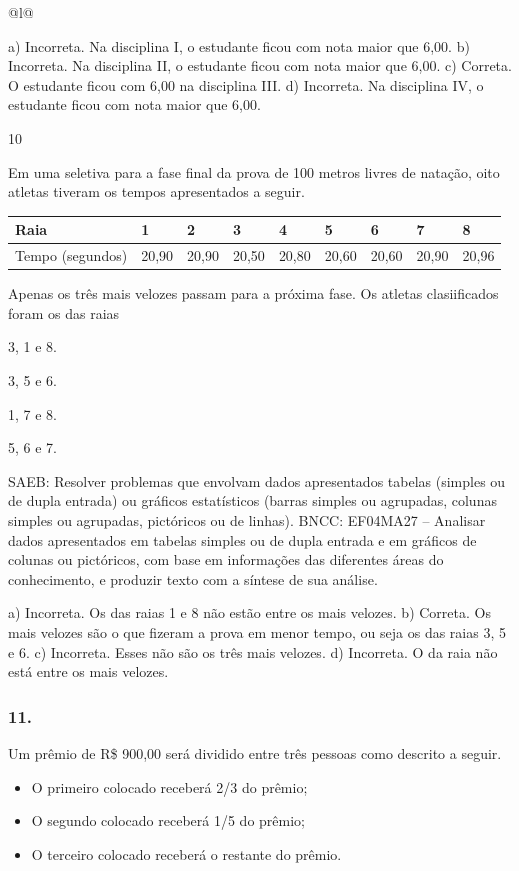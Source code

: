 \begin{mdframed}[linewidth=2pt,linecolor=salmao,roundcorner=2pt]
\begin{escolha}
{{{\begin{longtable}[]{@{}l@{}}
\begin{itemize}
{a) Incorreta. Na disciplina I, o estudante ficou com nota maior que 6,00.
b) Incorreta. Na disciplina II, o estudante ficou com nota maior que 6,00.
c) Correta. O estudante ficou com 6,00 na disciplina III.
d) Incorreta. Na disciplina IV, o estudante ficou com nota maior que 6,00.

\num{10}

Em uma seletiva para a fase final da prova de 100 metros livres de
natação, oito atletas tiveram os tempos apresentados a seguir.

\begin{longtable}[]{@{}ll@{}}
\toprule
Raia & 1 & 2 & 3 & 4 & 5 & 6 & 7 & 8\tabularnewline
\midrule
\endhead
Tempo (segundos) & 20,90 & 20,90 & 20,50 & 20,80 & 20,60 & 20,60 & 20,90 & 20,96\tabularnewline
\bottomrule
\end{longtable}

Apenas os três mais velozes passam para a próxima fase.
Os atletas clasiificados foram os das raias

\begin{escolha}
\item
  3, 1 e 8.
\item
  3, 5 e 6.
\item
  1, 7 e 8.
\item
  5, 6 e 7.
\end{escolha}

SAEB: Resolver problemas que envolvam dados apresentados tabelas (simples ou
de dupla entrada) ou gráficos estatísticos (barras simples ou agrupadas,
colunas simples ou agrupadas, pictóricos ou de linhas).
BNCC: EF04MA27 -- Analisar dados apresentados em tabelas simples ou de dupla entrada e em gráficos de
colunas ou pictóricos, com base em informações das diferentes áreas do conhecimento, e produzir
texto com a síntese de sua análise.

a) Incorreta. Os das raias 1 e 8 não estão entre os mais velozes.
b) Correta. Os mais velozes são o que fizeram a prova em menor tempo, ou seja os das raias 3, 5 e 6.
c) Incorreta. Esses não são os três mais velozes.
d) Incorreta. O da raia não está entre os mais velozes.

\subsubsection{11.}

Um prêmio de R\$ 900,00 será dividido entre três pessoas como descrito a seguir.

\begin{itemize}
\item
  O primeiro colocado receberá 2/3 do prêmio;
\item
  O segundo colocado receberá 1/5 do prêmio;
\item
  O terceiro colocado receberá o restante do prêmio.
\end{itemize}

}
\end{itemize}
\end{longtable}}}}
\end{escolha}
\end{mdframed}
